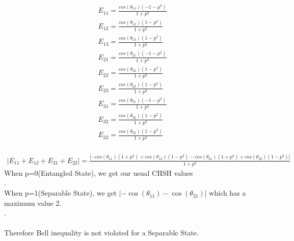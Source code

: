 \documentclass{article}
\begin{document}
   \begin{align*}
   E_{11}=\frac{cos(\theta_{11})(-1-p^2)}{1+p^2}\\
   E_{12}=\frac{cos(\theta_{12})(1-p^2)}{1+p^2}\\
   E_{13}=\frac{cos(\theta_{13})(1-p^2)}{1+p^2}\\
   E_{21}=\frac{cos(\theta_{21})(-1-p^2)}{1+p^2}\\
   E_{22}=\frac{cos(\theta_{22})(1-p^2)}{1+p^2}\\
   E_{23}=\frac{cos(\theta_{23})(1-p^2)}{1+p^2}\\
   E_{31}=\frac{cos(\theta_{31})(-1-p^2)}{1+p^2}\\
   E_{32}=\frac{cos(\theta_{32})(1-p^2)}{1+p^2}\\
   E_{32}=\frac{cos(\theta_{33})(1-p^2)}{1+p^2}\\
   \end{align*}
   
   \begin{align*}
	|E_{11}+E_{12}+E_{21}+E_{22}|
	=\frac{|-cos(\theta_{11})(1+p^2)+cos(\theta_{12})(1-p^2)-cos(\theta_{21})(1+p^2)+cos(\theta_{22})(1-p^2)|}{1+p^2}
   \end{align*}
   When p=0(Entangled State), we get our usual CHSH values\\
   
   .\\
   When p=1(Separable State), we get $|-\cos(\theta_{11})-\cos(\theta_{21})|$ which has a 
   maximum value 2.\\
   .\\\\
   Therefore Bell inequality is not violated for a Separable State.
  
  
 
 
 
 
\end{document}
